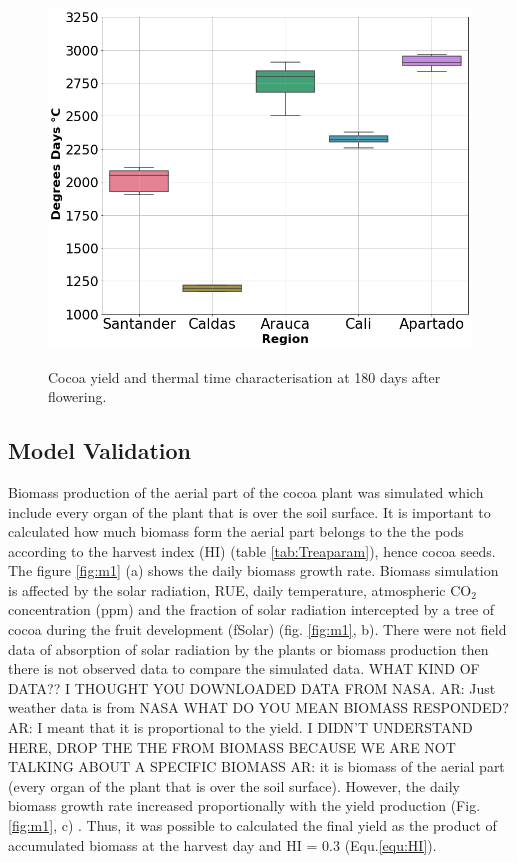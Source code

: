 \documentclass[gene,journal,article,submit,moreauthors,pdftex]{Definitions/mdpi}
\begin{document}
\begin{figure}[h!]
	\centering
	\includegraphics[scale=0.3]{images/ttbbox.png}\\
	\caption{\footnotesize {Cocoa yield and thermal time characterisation at 180 days after flowering.\\}}
	\label{fig:ttbox}
\end{figure}



\subsection{Model Validation}
{\color{olive}Biomass production of the aerial part of the cocoa plant was simulated which include every organ of the plant that is over the soil surface. It is important to calculated how much biomass  form the aerial part belongs to the the pods according to the harvest index (HI) (table \ref{tab:Treaparam}), hence cocoa seeds. The figure \ref{fig:m1} (a) shows the daily biomass growth rate.} Biomass simulation is affected by the solar radiation, RUE, daily temperature, atmospheric CO$_{2}$ concentration (ppm) and the fraction of solar radiation intercepted by a tree of cocoa during the fruit development (fSolar) (fig. \ref{fig:m1}, b).{\color{olive} There were not field data of absorption of solar radiation by the plants or biomass production then there is not observed data to compare the simulated data.}   {\color{blue}WHAT KIND OF DATA?? I THOUGHT YOU DOWNLOADED DATA FROM NASA. AR: Just weather data is from NASA  } {\color{blue} WHAT DO YOU MEAN BIOMASS RESPONDED? AR: I meant that it is proportional to the yield.  I DIDN'T UNDERSTAND HERE, DROP THE THE FROM BIOMASS BECAUSE WE ARE NOT TALKING ABOUT A SPECIFIC BIOMASS AR: it is biomass of the aerial part (every organ of the plant that is over the soil surface)}. {\color{olive} However, the daily biomass growth rate increased proportionally with the yield production (Fig. \ref{fig:m1}, c) .   Thus, it was possible to calculated the final yield as the product of accumulated biomass at the harvest day and HI = 0.3 (Equ.\ref{equ:HI}).}
\end{document}
